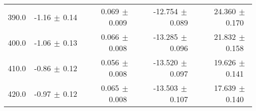 \begin{table}[htbp]
\begin{center}
\begin{tabular}{|c||r|r||r|r|}
390.0 & -1.16$\,\pm\,$0.14$\;\;\;$ &  0.069$\,\pm\,$0.009$\;\;$ & -12.754$\,\pm\,$0.089$\;$ & 24.360$\,\pm\,$0.170$\;\;$ \\ 
400.0 & -1.06$\,\pm\,$0.13$\;\;\;$ &  0.066$\,\pm\,$0.008$\;\;$ & -13.285$\,\pm\,$0.096$\;$ & 21.832$\,\pm\,$0.158$\;\;$ \\ 
410.0 & -0.86$\,\pm\,$0.12$\;\;\;$ &  0.056$\,\pm\,$0.008$\;\;$ & -13.520$\,\pm\,$0.097$\;$ & 19.626$\,\pm\,$0.141$\;\;$ \\ 
420.0 & -0.97$\,\pm\,$0.12$\;\;\;$ &  0.065$\,\pm\,$0.008$\;\;$ & -13.503$\,\pm\,$0.107$\;$ & 17.639$\,\pm\,$0.140$\;\;$ \\ 
\hline 
\end{tabular} 

\end{center} 
\end{table} 
